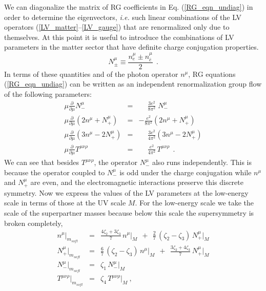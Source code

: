 \documentclass[paper,12pt]{revtex4}
\begin{document}
	We can diagonalize the matrix of RG coefficients in Eq. (\ref{RG_eqn_undiag})
	in order to determine the eigenvectors, {\em i.e.} such linear combinations of the LV
	operators (\ref{LV_matter}--\ref{LV_gauge}) that are renormalized only due to themselves.
	At this point it is useful to introduce the combinations of LV parameters in the matter 
	 sector that have definite charge conjugation properties. 
\begin{equation}
\label{def_Nmu}
      N^\mu_\pm \equiv \frac{ n_e^\mu \pm n_{\bar{e}}^\mu }{2}~~.
\end{equation}
	In terms of these quantities and of the photon operator
	$ n^\mu $, RG equations (\ref{RG_eqn_undiag}) can be
	written as an independent renormalization group flow of 
	the following
	parameters:
\begin{eqnarray}
\nonumber
     \mu \frac{\partial}
              {\partial\mu} 
              N_-^\mu & = & \phantom{-} \frac{3e^2}
                                {8\pi^2} \; N_-^\mu \\
\label{RG_eqn_diag}
     \mu \frac{\partial}
              {\partial\mu}
           \left( 2 n^\mu + N_+^\mu \right ) & = &
                 - \frac{e^2}
                        {8\pi^2} 
	   \left( 2 n^\mu + N_+^\mu \right )  \\
\nonumber
     \mu \frac{\partial}
              {\partial\mu}
	   \left( 3 n^\mu - 2 N_+^\mu \right ) & = & \phantom{-} 
                  \frac{3e^2}
                       {4\pi^2} 
	   \left( 3 n^\mu - 2 N_+^\mu \right ) \\
\nonumber
     \mu \frac{\partial}
              {\partial\mu}
		T^{\mu\nu\rho} & = & 
			\phantom{-} 
	                  \frac{e^2}
        	               {4\pi^2}\, 
			T^{\mu\nu\rho}
	~~.
\end{eqnarray}
	We can see that besides $ T^{\mu\nu\rho} $, the operator
	$ N_-^\mu $ also runs independently. This is because the operator 
	coupled to $N_-^\mu$ is odd under the charge conjugation while 
	$n^\mu$ and $N_+^\mu$ are even, and the electromagnetic interactions 
	preserve this discrete symmetry.  
	Now we express the values of the LV parameters at the
	low-energy scale in terms of those at the UV scale $M$. For the low-energy scale 
	we take the scale of the superpartner masses because below this scale the supersymmetry is 
	broken completely, 
\begin{eqnarray}
\nonumber
	n^\mu \Bigr|_{m_{soft}} & = & 
	\frac{4\zeta_2 + 3\zeta_3}
	           {7}              \, n^\mu \Bigr|_M
	~~+~~
	\frac{2}{7}\, 
	\left( \zeta_2 - \zeta_3 \right)\, N_+^\mu \Bigr|_M \\
\label{LV_at_soft_scale}
	N_+^\mu \Bigr|_{m_{soft}} & = & 
	\frac{6}{7}\,
	\left( \zeta_2 - \zeta_3 \right)\, n^\mu \Bigr|_M
	~~+~~
	\frac{3\zeta_2 + 4\zeta_3}
                    {7}           \,  N_+^\mu \Bigr|_M \\
\nonumber
	N_-^\mu \Bigr|_{m_{soft}} & = & 
	\zeta_1\, N_-^\mu \Bigr|_M \\
\nonumber
	T^{\mu\nu\rho} \Bigr|_{m_{soft}} & = & 
	\zeta_4\, T^{\mu\nu\rho}\Bigr|_M~,
\end{eqnarray}
\end{document}

